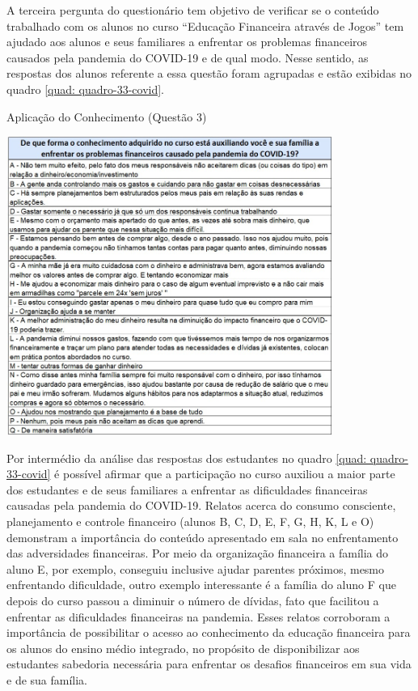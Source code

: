 A terceira pergunta do questionário tem objetivo de verificar se o conteúdo trabalhado com os alunos no curso “Educação Financeira através de Jogos” tem ajudado aos alunos e seus familiares a enfrentar os problemas financeiros causados pela pandemia do COVID-19 e de qual modo. Nesse sentido, as respostas dos alunos referente a essa questão foram agrupadas e estão exibidas no quadro \ref{quad: quadro-33-covid}.

\graphicspath{{quadros/}}
\begin{quadro}[!ht]
\centering
\begin{minipage}{0.80\textwidth}
\caption{Aplicação do Conhecimento (Questão 3)}
\centering
\includegraphics[width=0.80\textwidth]{quadro-33-covid}
\label{quad: quadro-33-covid}
\end{minipage}
\end{quadro}

\newpage
Por intermédio da análise das respostas dos estudantes no quadro \ref{quad: quadro-33-covid} é possível afirmar que a participação no curso auxiliou a maior parte dos estudantes e de seus familiares a enfrentar as dificuldades financeiras causadas pela pandemia do COVID-19. Relatos acerca do consumo consciente, planejamento e controle financeiro (alunos B, C, D, E, F, G, H, K, L e O) demonstram a importância do conteúdo apresentado em sala no enfrentamento das adversidades financeiras. Por meio da organização financeira a família do aluno E, por exemplo, conseguiu inclusive ajudar parentes próximos, mesmo enfrentando dificuldade, outro exemplo interessante é a família do aluno F que depois do curso passou a diminuir o número de dívidas, fato que facilitou a enfrentar as dificuldades financeiras na pandemia. Esses relatos corroboram a importância de possibilitar o acesso ao conhecimento da educação financeira para os alunos do ensino médio integrado, no propósito de disponibilizar aos estudantes sabedoria necessária para enfrentar os desafios financeiros em sua vida e de sua família.

